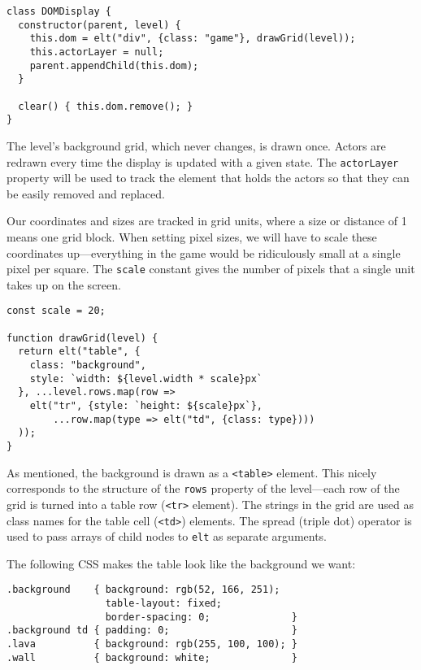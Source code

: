 \begin{lstlisting}
class DOMDisplay {
  constructor(parent, level) {
    this.dom = elt("div", {class: "game"}, drawGrid(level));
    this.actorLayer = null;
    parent.appendChild(this.dom);
  }

  clear() { this.dom.remove(); }
}
\end{lstlisting}
\noindent{}

The level's background grid, which never changes, is drawn once. Actors are redrawn every time the display is updated with a given state. The \lstinline`actorLayer` property will be used to track the element that holds the actors so that they can be easily removed and replaced.

Our coordinates and sizes are tracked in grid units, where a size or distance of 1 means one grid block. When setting pixel sizes, we will have to scale these coordinates up—everything in the game would be ridiculously small at a single pixel per square. The \lstinline`scale` constant gives the number of pixels that a single unit takes up on the screen.

\begin{lstlisting}
const scale = 20;

function drawGrid(level) {
  return elt("table", {
    class: "background",
    style: `width: ${level.width * scale}px`
  }, ...level.rows.map(row =>
    elt("tr", {style: `height: ${scale}px`},
        ...row.map(type => elt("td", {class: type})))
  ));
}
\end{lstlisting}
\noindent{}

As mentioned, the background is drawn as a \lstinline`<table>` element. This nicely corresponds to the structure of the \lstinline`rows` property of the level—each row of the grid is turned into a table row (\lstinline`<tr>` element). The strings in the grid are used as class names for the table cell (\lstinline`<td>`) elements. The spread (triple dot) operator is used to pass arrays of child nodes to \lstinline`elt` as separate arguments.

\label{game.game_css}The following CSS makes the table look like the background we want:

\begin{lstlisting}
.background    { background: rgb(52, 166, 251);
                 table-layout: fixed;
                 border-spacing: 0;              }
.background td { padding: 0;                     }
.lava          { background: rgb(255, 100, 100); }
.wall          { background: white;              }
\end{lstlisting}
\noindent{}

